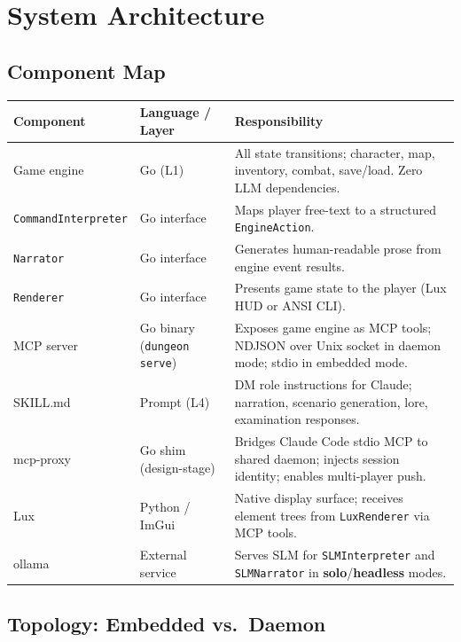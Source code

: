 \documentclass[a4paper,10pt]{article}
\newcommand{\iface}[1]{\texttt{#1}}
\newcommand{\cmd}[1]{\texttt{#1}}
\newcommand{\mode}[1]{\textbf{#1}}
\begin{document}
\section{System Architecture}

\subsection{Component Map}

\begin{center}
\begin{tabular}{lp{3cm}p{7cm}}
\toprule
\textbf{Component} & \textbf{Language / Layer} & \textbf{Responsibility} \\
\midrule
Game engine
  & Go (L1)
  & All state transitions; character, map, inventory, combat, save/load.
    Zero LLM dependencies. \\
\iface{CommandInterpreter}
  & Go interface
  & Maps player free-text to a structured \texttt{EngineAction}. \\
\iface{Narrator}
  & Go interface
  & Generates human-readable prose from engine event results. \\
\iface{Renderer}
  & Go interface
  & Presents game state to the player (Lux HUD or ANSI CLI). \\
MCP server
  & Go binary (\cmd{dungeon serve})
  & Exposes game engine as MCP tools; NDJSON over Unix socket in
    daemon mode; stdio in embedded mode. \\
SKILL.md
  & Prompt (L4)
  & DM role instructions for Claude; narration, scenario generation,
    lore, examination responses. \\
mcp-proxy
  & Go shim (design-stage)
  & Bridges Claude Code stdio MCP to shared daemon; injects session
    identity; enables multi-player push. \\
Lux
  & Python / ImGui
  & Native display surface; receives element trees from
    \texttt{LuxRenderer} via MCP tools. \\
ollama
  & External service
  & Serves SLM for \texttt{SLMInterpreter} and \texttt{SLMNarrator}
    in \mode{solo}/\mode{headless} modes. \\
\bottomrule
\end{tabular}
\end{center}

\subsection{Topology: Embedded vs.\ Daemon}
\end{document}
